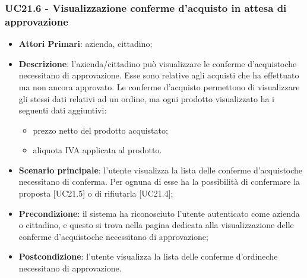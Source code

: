 \subsubsection{UC21.6 - Visualizzazione conferme d'acquisto in attesa di 
approvazione}
\begin{itemize}
	\item \textbf{Attori Primari}: azienda, cittadino;
	\item \textbf{Descrizione}: l'azienda/cittadino può visualizzare le conferme d'acquisto\glosp che necessitano di approvazione. Esse sono relative agli acquisti che ha effettuato ma non ancora approvato. Le conferme d'acquisto permettono di visualizzare gli stessi dati relativi ad un ordine, ma ogni prodotto visualizzato ha i seguenti dati aggiuntivi:
	\begin{itemize}
		\item prezzo netto del prodotto acquistato;	
		\item aliquota IVA applicata al prodotto.
	\end{itemize}
	\item \textbf{Scenario principale}: l'utente visualizza la lista delle 
	conferme d'acquisto\glosp che necessitano di conferma. Per ognuna di esse 
	ha la possibilità di confermare la proposta [UC21.5] o di rifiutarla 
	[UC21.4];

	\item \textbf{Precondizione}: il sistema ha riconosciuto l'utente autenticato come azienda o cittadino, e questo si trova nella pagina dedicata alla visualizzazione delle conferme d'acquisto\glosp che necessitano di approvazione;
	\item \textbf{Postcondizione}: l'utente visualizza la lista delle conferme d'ordine\glosp che necessitano di approvazione.
\end{itemize}





